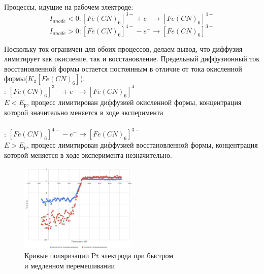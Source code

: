 \documentclass[a4paper,12pt]{article}
\begin{document}
Процессы, идущие на рабочем электроде:
\begin{equation*}
    I_{anode} < 0: [Fe(CN)_6]^{3-} + e^- \rightarrow [Fe(CN)_6]^{4-}
\end{equation*}
\begin{equation*}
    I_{anode} > 0: [Fe(CN)_6]^{4-} - e^- \rightarrow [Fe(CN)_6]^{3-}
\end{equation*}

Поскольку ток ограничен для обоих процессов, делаем вывод, что диффузия лимитирует как окисление, так и восстановление. Предельный диффузионный ток восстановленной формы остается постоянным в отличие от тока окисленной формы($K_3[Fe(CN)_6]$).\\
: $[Fe(CN)_6]^{3-} + e^- \rightarrow [Fe(CN)_6]^{4-} $ \\
$E < E_{\text{р}}$, процесс лимитирован диффузией окисленной формы, концентрация которой значительно меняется в ходе эксперимента\\\\
: $[Fe(CN)_6]^{4-} - e^- \rightarrow [Fe(CN)_6]^{3-}$\\
$E > E_{\text{р}}$, процесс лимитирован диффузией восстановленной формы, концентрация которой  меняется в ходе эксперимента незначительно.\\
\begin{figure}[h!]
    \centering
    \includegraphics[width = 0.5\textwidth]{pace.png}
    \caption{Кривые поляризации Pt электрода при быстром\\
и медленном перемешивании}
    \label{fig:no_int}
\end{figure}\\


\\
\begin{table}[h!]
\caption{Концентрация $K_{3}[Fe(CN)_{6}]$}
\label{tab:my-table}
\end{table}
\end{document}
